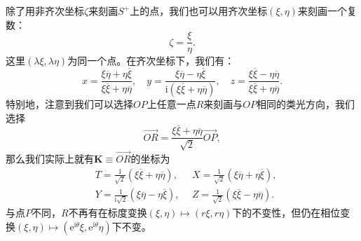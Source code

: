 除了用非齐次坐标$\zeta $来刻画$S^{+}$上的点，我们也可以用齐次坐标$( \xi ,\eta )$来刻画一个复数：
\begin{equation*}
	\zeta =\frac{\xi }{\eta } .
\end{equation*}
这里$( \lambda \xi ,\lambda \eta )$为同一个点。在齐次坐标下，我们有：
\begin{equation}
	x=\frac{\xi \overline{\eta } +\eta \overline{\xi }}{\xi \overline{\xi } +\eta \overline{\eta }} ,\quad y=\frac{\xi \overline{\eta } -\eta \overline{\xi }}{\mathrm{i} (\xi \overline{\xi } +\eta \overline{\eta } )} ,\quad z=\frac{\xi \overline{\xi } -\eta \overline{\eta }}{\xi \overline{\xi } +\eta \overline{\eta }} .
	\label{eq:homogeneous coordinate of stereoprojection}
\end{equation}
特别地，注意到我们可以选择$OP$上任意一点$R$来刻画与$OP$相同的类光方向，我们选择
\begin{equation*}
	\overrightarrow{OR} =\frac{\xi \overline{\xi } +\eta \overline{\eta }}{\sqrt{2}}\overrightarrow{OP} ,
\end{equation*}
那么我们实际上就有$\boldsymbol{K} \equiv \overrightarrow{OR}$的坐标为
\begin{equation}
	\begin{aligned}
		& T=\frac{1}{\sqrt{2}} (\xi \overline{\xi } +\eta \overline{\eta } ),\ \  & X=\frac{1}{\sqrt{2}} (\xi \overline{\eta } +\eta \overline{\xi } ),\\
		& Y=\frac{1}{\mathrm{i}\sqrt{2}} (\xi \overline{\eta } -\eta \overline{\xi } ),\ \  & Z=\frac{1}{\sqrt{2}} (\xi \overline{\xi } -\eta \overline{\eta } ).
	\end{aligned}
	\label{eq:real and complex coordinate}
\end{equation}
与点$P$不同，$R$不再有在标度变换$( \xi ,\eta ) \mapsto ( r\xi ,r\eta )$下的不变性，但仍在相位变换$( \xi ,\eta ) \mapsto (\mathrm{e}^{\mathrm{i} \theta } \xi ,\mathrm{e}^{\mathrm{i} \theta } \eta )$下不变。



